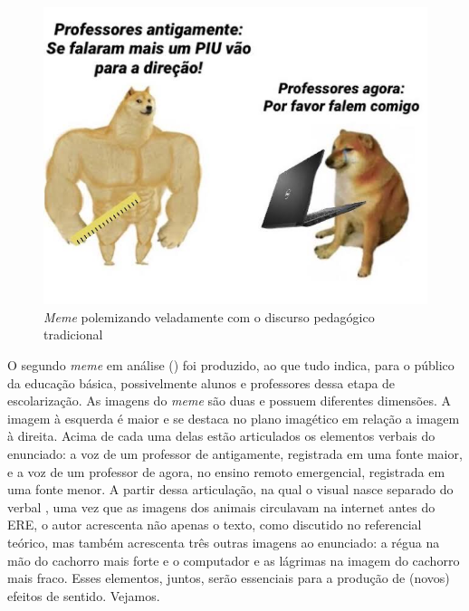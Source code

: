 \documentclass[portuguese]{textolivre}
\begin{document}
\begin{figure}[h!]
\centering
\begin{minipage}{.8\textwidth}
\includegraphics[width=\textwidth]{a46126Texto20do20artigo1489961706781120230920-img002.jpg}
\caption{\textit{Meme} polemizando veladamente com o discurso pedagógico tradicional}
\label{fig:fig2}
\end{minipage}
\end{figure}	
	
O segundo \textit{meme} em análise () foi produzido, ao que tudo indica, para o público da educação básica, possivelmente alunos e professores dessa etapa de escolarização. As imagens do \textit{meme} são duas e possuem diferentes dimensões. A imagem à esquerda é maior e se destaca no plano imagético em relação a imagem à direita. Acima de cada uma delas estão articulados os elementos verbais do enunciado: a voz de um professor de antigamente, registrada em uma fonte maior, e a voz de um professor de agora, no ensino remoto emergencial, registrada em uma fonte menor. A partir dessa articulação, na qual o visual nasce separado do verbal \cite{lima2022reflexao}, uma vez que as imagens dos animais circulavam na internet antes do ERE, o autor acrescenta não apenas o texto, como discutido no referencial teórico, mas também acrescenta três outras imagens ao enunciado: a régua na mão do cachorro mais forte e o computador e as lágrimas na imagem do cachorro mais fraco. Esses elementos, juntos, serão essenciais para a produção de (novos) efeitos de sentido. Vejamos.
	
\end{document}
